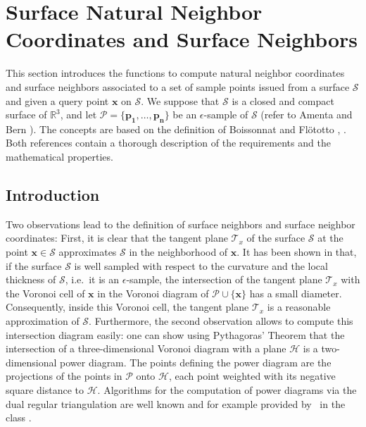 \section{Surface Natural Neighbor Coordinates and Surface Neighbors\label{sec:surface}}

This section introduces the functions to compute natural neighbor
coordinates and surface neighbors associated to a set of sample points
issued from a surface $\mathcal{S}$ and given a query point
$\mathbf{x}$ on $\mathcal{S}$. We suppose that $\mathcal{S}$ is a
closed and compact surface of $\mathbb{R}^3$, and let $\mathcal{P}=
\{\mathbf{p_1}, \ldots,\mathbf{p_n}\}$ be an $\epsilon$-sample of
$\mathcal{S}$ (refer to Amenta and Bern \cite{ab-srvf-99}). The
concepts are based on the definition of Boissonnat and Fl\"ototto
\cite{bf-lcss-02}, \cite{cgal:f-csapc-03}.  Both references
contain a thorough description of the requirements and the
mathematical properties.

\subsection{Introduction}

Two observations lead to the definition of surface neighbors and
surface neighbor coordinates: First, it is clear that the tangent
plane $\mathcal{T}_x$ of the surface $\mathcal{S}$ at the point
$\mathbf{x} \in \mathcal{S}$ approximates $\mathcal{S}$ in the
neighborhood of $\mathbf{x}$. It has been shown in \cite{bf-lcss-02}
that, if the surface $\mathcal{S}$ is well sampled with respect to the
curvature and the local thickness of $\mathcal{S}$, i.e.\ it is an $\epsilon$-sample, the intersection
of the tangent plane $\mathcal{T}_x$ with the Voronoi cell of
$\mathbf{x}$ in the Voronoi diagram of $\mathcal{P} \cup
\{\mathbf{x}\}$ has a small diameter.  Consequently, inside this
Voronoi cell, the tangent plane $\mathcal{T}_x$ is a reasonable
approximation of $\mathcal{S}$. Furthermore, the second observation
allows to compute this intersection diagram easily: one can show using
Pythagoras' Theorem that the intersection of a three-dimensional
Voronoi diagram with a plane $\mathcal{H}$ is a two-dimensional power
diagram. The points defining the power diagram are the projections of
the points in $\mathcal{P}$ onto $\mathcal{H}$, each point weighted
with its negative square distance to $\mathcal{H}$. Algorithms for the
computation of power diagrams via the dual regular triangulation are
well known and for example provided by \cgal\ in the class
.

